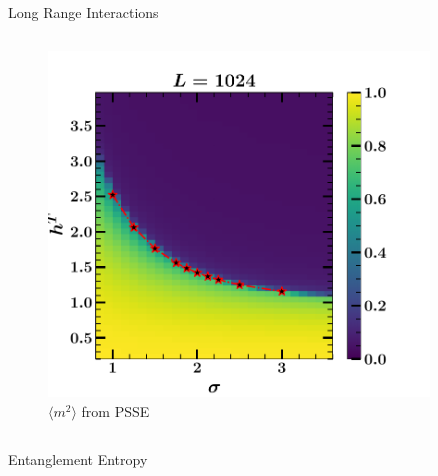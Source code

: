 \documentclass[final,hyperref={pdfpagelabels=false}]{beamer}
\begin{document}
\begin{frame}[t]
\begin{columns}[t]
\begin{column}{.48\textwidth}
\begin{block}{Long Range Interactions}
\begin{columns}[T,onlytextwidth]
\begin{figure}[H]
\centering
\includegraphics[width=0.9\textwidth]{2023-tiwari-espresso-summer-school-poster-session-pimd-main/figures/zero_temp_lrtfim_study_h_sigma.pdf}
\caption{$\langle m^2 \rangle$ from PSSE}
\end{figure}
\end{columns}
\end{block}

\begin{block}{Entanglement Entropy}


\end{block}
\end{column}
\end{columns}
\end{frame}
\end{document}
